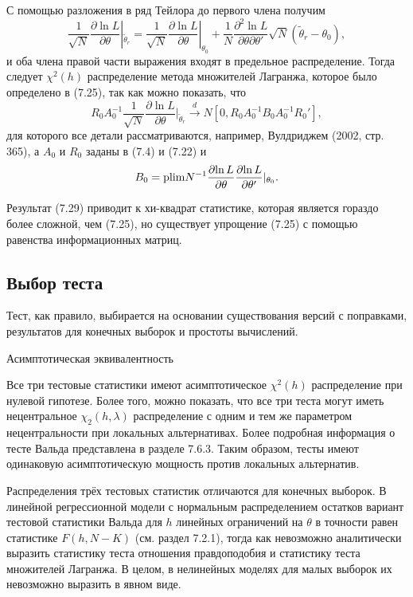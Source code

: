С помощью разложения в ряд Тейлора до первого члена получим
\[
\frac{1}{\sqrt{N}} \frac{\partial{\ln L}}{\partial{\theta}}|_{\tilde{\theta}_r} = \frac{1}{\sqrt{N}} \frac{\partial{\ln L}}{\partial{\theta}}|_{\theta_0} + \frac{1}{N} \frac{\partial^2{\ln L}}{\partial{\theta}\partial{\theta}'}\sqrt{N}(\tilde{\theta}_r - \theta_0),
\]
и оба члена правой части выражения входят в предельное распределение. Тогда следует $\chi^2(h)$ распределение метода множителей Лагранжа, которое было определено в (7.25), так как можно показать, что
\begin{equation}
R_0A_0^{-1} \frac{1}{\sqrt{N}} \frac{\partial{\ln L}}{\partial{\theta}}|_{\tilde{\theta}_r} \stackrel{d}{\rightarrow} N[0, R_0A_0^{-1}B_0A_0^{-1}R_0'],
\end{equation}
для которого все детали рассматриваются, например, Вулдриджем (2002, стр. 365), а $A_0$ и $R_0$ заданы в (7.4) и (7.22) и
\begin{equation}
B_0 = \mathrm{plim } N^{-1}\frac{\partial{\ln L}}{\partial{\theta}}\frac{\partial{\ln L}}{\partial{\theta}'}|_{\theta_0}.
\end{equation}

Результат (7.29) приводит к хи-квадрат статистике, которая является гораздо более сложной, чем (7.25), но существует упрощение (7.25) с помощью равенства информационных матриц.

\subsection{Выбор теста}

Тест, как правило, выбирается на основании существования версий с поправками, результатов для конечных выборок и простоты вычислений.

\begin{center}
Асимптотическая эквивалентность
\end{center}

Все три тестовые статистики имеют асимптотическое $\chi^2(h)$ распределение при нулевой гипотезе. Более того, можно показать, что все три теста могут иметь нецентральное  $\chi_2(h,\lambda)$ распределение с одним и тем же параметром нецентральности при локальных альтернативах. Более подробная информация о тесте Вальда представлена в разделе 7.6.3. Таким образом, тесты имеют одинаковую асимптотическую мощность против локальных альтернатив.

Распределения трёх тестовых статистик отличаются для конечных выборок. В линейной регрессионной модели с нормальным распределением остатков вариант тестовой статистики Вальда для $h$ линейных ограничений на $\theta$ в точности равен статистике $F(h, N - K)$ (см. раздел 7.2.1), тогда как невозможно аналитически выразить статистику теста отношения правдоподобия и статистику теста множителей Лагранжа. В целом, в нелинейных моделях для малых выборок их невозможно выразить в явном виде.

